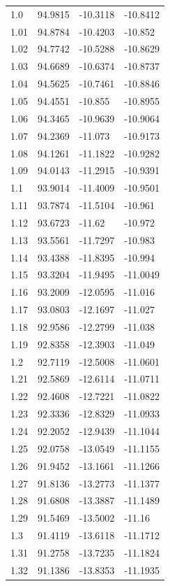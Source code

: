 \begin{tabular}{llll}
1.0 & 94.9815 & -10.3118 & -10.8412 \\
1.01 & 94.8784 & -10.4203 & -10.852 \\
1.02 & 94.7742 & -10.5288 & -10.8629 \\
1.03 & 94.6689 & -10.6374 & -10.8737 \\
1.04 & 94.5625 & -10.7461 & -10.8846 \\
1.05 & 94.4551 & -10.855 & -10.8955 \\
1.06 & 94.3465 & -10.9639 & -10.9064 \\
1.07 & 94.2369 & -11.073 & -10.9173 \\
1.08 & 94.1261 & -11.1822 & -10.9282 \\
1.09 & 94.0143 & -11.2915 & -10.9391 \\
1.1 & 93.9014 & -11.4009 & -10.9501 \\
1.11 & 93.7874 & -11.5104 & -10.961 \\
1.12 & 93.6723 & -11.62 & -10.972 \\
1.13 & 93.5561 & -11.7297 & -10.983 \\
1.14 & 93.4388 & -11.8395 & -10.994 \\
1.15 & 93.3204 & -11.9495 & -11.0049 \\
1.16 & 93.2009 & -12.0595 & -11.016 \\
1.17 & 93.0803 & -12.1697 & -11.027 \\
1.18 & 92.9586 & -12.2799 & -11.038 \\
1.19 & 92.8358 & -12.3903 & -11.049 \\
1.2 & 92.7119 & -12.5008 & -11.0601 \\
1.21 & 92.5869 & -12.6114 & -11.0711 \\
1.22 & 92.4608 & -12.7221 & -11.0822 \\
1.23 & 92.3336 & -12.8329 & -11.0933 \\
1.24 & 92.2052 & -12.9439 & -11.1044 \\
1.25 & 92.0758 & -13.0549 & -11.1155 \\
1.26 & 91.9452 & -13.1661 & -11.1266 \\
1.27 & 91.8136 & -13.2773 & -11.1377 \\
1.28 & 91.6808 & -13.3887 & -11.1489 \\
1.29 & 91.5469 & -13.5002 & -11.16 \\
1.3 & 91.4119 & -13.6118 & -11.1712 \\
1.31 & 91.2758 & -13.7235 & -11.1824 \\
1.32 & 91.1386 & -13.8353 & -11.1935 \\

\end{tabular}

